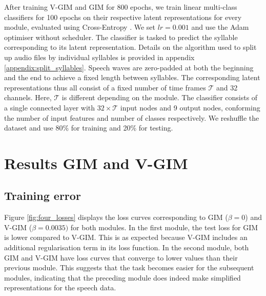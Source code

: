 	
		After training V-GIM and GIM for 800 epochs, we train linear multi-class classifiers for 100 epochs on their respective latent representations for every module, evaluated using Cross-Entropy \cite{hoRealWorldWeightCrossEntropyLoss2020}. We set $lr=0.001$ and use the Adam optimiser without scheduler. The classifier is tasked to predict the syllable corresponding to its latent representation. Details on the algorithm used to split up audio files by individual syllables is provided in appendix \ref{appendix:split_syllables}. Speech waves are zero-padded at both the beginning and the end to achieve a fixed length between syllables. The corresponding latent representations thus all consist of a fixed number of time frames $\mathcal{T}$ and 32 channels. Here, $\mathcal{T}$ is different depending on the module. 
		The classifier consists of a single connected layer with $32 \times \mathcal{T}$ input nodes and 9 output nodes, conforming the number of input features and number of classes respectively.  We reshuffle the dataset and use 80\% for training and 20\% for testing.

	

	\section{Results GIM and V-GIM}	
	\subsection{Training error} \label{cha:experiments_vgim_train_err}
		
		
		Figure \ref{fig:four_losses} displays the loss curves corresponding to GIM ($\beta=0$) and V-GIM ($\beta=0.0035)$ for both modules. In the first module, the test loss for GIM is lower compared to V-GIM. This is as expected because V-GIM includes an additional regularisation term in its loss function. In the second module, both GIM and V-GIM have loss curves that converge to lower values than their previous module. This suggests that the task becomes easier for the subsequent modules, indicating that the preceding module does indeed make simplified representations for the speech data.
		
